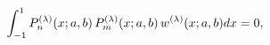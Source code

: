 \[{\int_{-1}^{1}\mathop{P^{(\lambda)}_{n}\/}\nolimits\!\left(x;a,b\right)\mathop%
{P^{(\lambda)}_{m}\/}\nolimits\!\left(x;a,b\right)w^{(\lambda)}(x;a,b)dx=0},\]